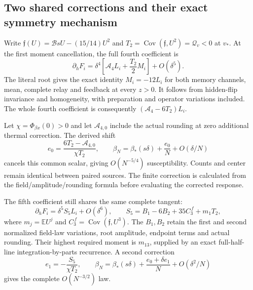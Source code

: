 \subsection{Two shared corrections and their exact symmetry mechanism}

Write $\mathfrak f(U)=\mathcal B sU-(15/14)U^2$ and
$T_2=\operatorname{Cov}(\mathfrak f,U^2)=\mathcal Q_v<0$ at $v_*$. At the first moment cancellation, the full fourth coefficient is
\begin{equation}
 \partial_hF_i=\delta^4
 \left[\mathcal A_4L_i+\frac{T_2}{2}M_i\right]+O(\delta^5).
\end{equation}
The literal root gives the exact identity $M_i=-12L_i$ for both memory channels, mean, complete relay and feedback at every $z>0$. It follows from hidden-flip invariance and homogeneity, with preparation and operator variations included. The whole fourth coefficient is consequently $(\mathcal A_4-6T_2)L_i$.

Let $\chi=\Phi_{\beta x}(0)>0$ and let $\mathcal A_{4,0}$ include the actual rounding at zero additional thermal correction. The derived shift
\begin{equation}
 e_0=\frac{6T_2-\mathcal A_{4,0}}{\chi T_2},\qquad
 \beta_N=\beta_*(s\delta)+\frac{e_0}{N}
 +O(\delta/N)
\end{equation}
cancels this common scalar, giving $O(N^{-5/4})$ susceptibility. Counts and center remain identical between paired sources. The finite correction is calculated from the field/amplitude/rounding formula before evaluating the corrected response.

The fifth coefficient still shares the same complete tangent:
\begin{equation}
 \partial_hF_i=\delta^5S_5L_i+O(\delta^6),\qquad
 S_5=B_1-6B_2+35C_3^{\,f}+m_1T_2,
\end{equation}
where $m_j=\mathbb E U^j$ and $C_3^{\,f}=\operatorname{Cov}(\mathfrak f,U^3)$. The $B_1,B_2$ retain the first and second normalized field-law variations, root amplitude, endpoint terms and actual rounding. Their highest required moment is $m_{13}$, supplied by an exact full-half-line integration-by-parts recurrence. A second correction
\begin{equation}
 e_1=-\frac{S_5}{\chi T_2},\qquad
 \beta_N=\beta_*(s\delta)+\frac{e_0+\delta e_1}{N}
 +O(\delta^2/N)
\end{equation}
gives the complete $O(N^{-3/2})$ law.

